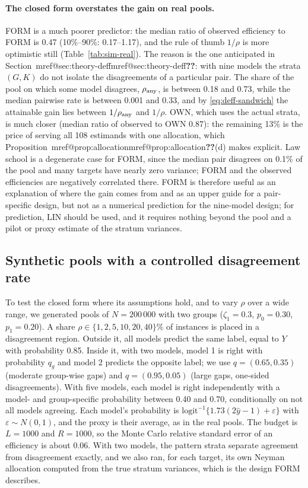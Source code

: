 \documentclass[pdflatex,sn-mathphys-num,iicol]{sn-jnl}
\makeatletter
\theoremstyle{thmstyleone}
\theoremstyle{thmstyletwo}
\theoremstyle{thmstylethree}
\newcommand{\Mref}[1]{\ifcsname mref@#1\endcsname\csname mref@#1\endcsname\else\textbf{??}\fi}
\makeatother
\begin{document}
\paragraph{The closed form overstates the gain on real pools.} FORM is a much poorer predictor: the
median ratio of observed efficiency to FORM is 0.47 (10\%--90\%: 0.17--1.17), and the rule of thumb
$1/\rho$ is more optimistic still (Table~\ref{tab:sim-real}). The reason is the one anticipated in
Section~\Mref{sec:theory-deff}: with nine models the strata $(G,K)$ do not isolate the disagreements of
a particular pair. The share of the pool on which some model disagrees, $\rho_{\rm any}$, is between
0.18 and 0.73, while the median pairwise rate is between 0.001 and 0.33, and by
\eqref{eq:deff-sandwich} the attainable gain lies between $1/\rho_{\rm any}$ and $1/\rho$. OWN, which
uses the actual strata, is much closer (median ratio of observed to OWN 0.87): the remaining 13\% is
the price of serving all 108 estimands with one allocation, which Proposition~\Mref{prop:allocation}(d)
makes explicit. Law school is a degenerate case for FORM, since the median pair disagrees on 0.1\% of
the pool and many targets have nearly zero variance; FORM and the observed efficiencies are
negatively correlated there. FORM is therefore useful as an explanation of where the gain comes from
and as an upper guide for a pair-specific design, but not as a numerical prediction for the
nine-model design; for prediction, LIN should be used, and it requires nothing beyond the pool and a
pilot or proxy estimate of the stratum variances.

\subsection{Synthetic pools with a controlled disagreement rate}\label{sec:sim-synth}

To test the closed form where its assumptions hold, and to vary $\rho$ over a wide range, we
generated pools of $N=200\,000$ with two groups ($\zeta_1=0.3$, $p_0=0.30$, $p_1=0.20$). A share
$\rho\in\{1,2,5,10,20,40\}\%$ of instances is placed in a disagreement region. Outside it, all models
predict the same label, equal to $Y$ with probability 0.85. Inside it, with two models, model 1 is
right with probability $q_g$ and model 2 predicts the opposite label; we use $q=(0.65,0.35)$
(moderate group-wise gaps) and $q=(0.95,0.05)$ (large gaps, one-sided disagreements). With five
models, each model is right independently with a model- and group-specific probability between 0.40
and 0.70, conditionally on not all models agreeing. Each model's probability is
$\mathrm{logit}^{-1}\{1.73(2\hat y-1)+\varepsilon\}$ with $\varepsilon\sim N(0,1)$, and the proxy is their
average, as in the real pools. The budget is $L=1000$ and $R=1000$, so the Monte Carlo relative
standard error of an efficiency is about 0.06. With two models, the pattern strata separate agreement
from disagreement exactly, and we also ran, for each target, its own Neyman allocation computed from
the true stratum variances, which is the design FORM describes.
\end{document}

